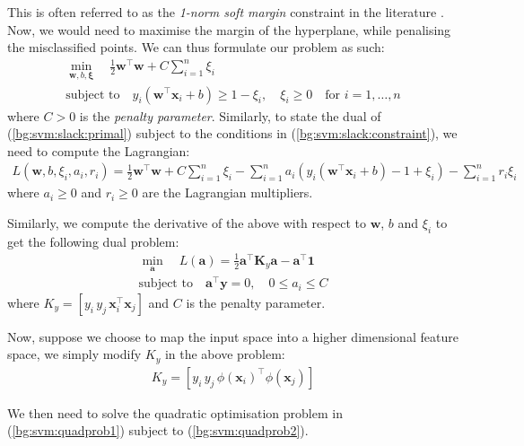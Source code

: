 \documentclass[12pt, twoside, a4paper]{report}
\def\vec{\boldsymbol}
\begin{document}
This is often referred to as the \textit{1-norm soft margin} constraint in the literature \cite{RefWorks:127}. Now, we would need to maximise the margin of the hyperplane, while penalising the misclassified points. We can thus formulate our problem as such:
\begin{gather}
\min_{\vec{w}, b, \vec{\xi}} \quad \frac{1}{2}\vec{w}^\top \vec{w} + C \sum_{i=1}^n \xi_i \label{bg:svm:slack:primal} \\
\text{subject to} \quad y_i(\vec{w}^\top \vec{x}_i + b) \geq 1 - \xi_i , \quad 
\xi_i \geq 0 \quad \text{for $i = 1, \dots , n$}\label{bg:svm:slack:constraint}
\end{gather}
where $C>0$ is the \textit{penalty parameter}. Similarly, to state the dual of (\ref{bg:svm:slack:primal}) subject to the conditions in (\ref{bg:svm:slack:constraint}), we need to compute the Lagrangian:
\begin{align*}
L(\vec{w}, b, \xi_i, a_i, r_i) =
\frac{1}{2} \vec{w}^\top \vec{w} + C \sum_{i=1}^n \xi_i - \sum_{i=1}^n a_i(y_i(\vec{w}^\top \vec{x}_i + b) - 1 + \xi_i) - \sum_{i=1}^n r_i\xi_i
\end{align*}
where $a_i \geq 0$ and $r_i \geq 0$ are the Lagrangian multipliers.

Similarly, we compute the derivative of the above with respect to $\vec{w}$, $b$ and $\xi_i$ to get the following dual problem:
\begin{gather}
\min_{\vec{a}} \quad L(\vec{a}) = \frac{1}{2}\vec{a}^\top \vec{K}_y \vec{a} - \vec{a}^\top \vec{1} \label{bg:svm:quadprob1} \\
\text{subject to} \quad \vec{a}^\top \vec{y} = 0, \quad 0 \leq a_i \leq C \label{bg:svm:quadprob2}
\end{gather}
where $K_y = [y_i \, y_j \, \vec{x}_i^\top \vec{x}_j]$ and $C$ is the penalty parameter.

Now, suppose we choose to map the input space into a higher dimensional feature space, we simply modify $K_y$ in the above problem:
\begin{align*}
K_y = [y_i \, y_j \, \phi(\vec{x}_i)^\top \phi(\vec{x}_j)]
\end{align*}

We then need to solve the quadratic optimisation problem in (\ref{bg:svm:quadprob1}) subject to (\ref{bg:svm:quadprob2}).
\end{document}
